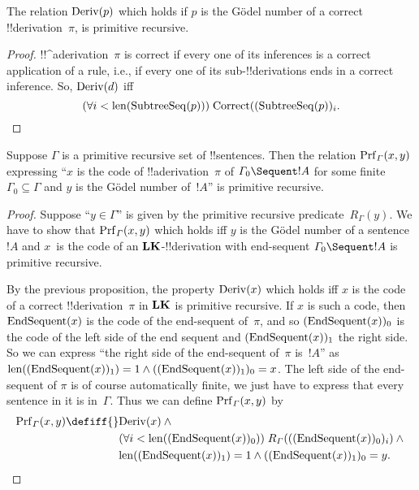 \documentclass[../../../include/open-logic-section]{subfiles}
\begin{document}
\begin{prop}
  The relation $\mathrm{Deriv}(p)$ which holds if $p$ is the G\"odel
  number of a correct !!{derivation}~$\pi$, is primitive recursive.
\end{prop}

\begin{proof}
  !!^a{derivation}~$\pi$ is correct if every one of its inferences
  is a correct application of a rule, i.e., if every one of its
  sub-!!{derivation}s ends in a correct inference. So, $\mathrm{Deriv}(d)$
  iff
  \[
  (\forall i<\mathrm{len}(\mathrm{SubtreeSeq}(p)))\; \mathrm{Correct}((\mathrm{SubtreeSeq}(p))_i.
  \]
\end{proof}


\begin{prop}
Suppose $\Gamma$ is a primitive recursive set of !!{sentence}s.  Then
the relation $\Prf[\Gamma](x, y)$ expressing ``$x$ is the code of
!!a{derivation}~$\pi$ of $\Gamma_0 \Sequent !A$ for some finite
$\Gamma_0 \subseteq \Gamma$ and $y$ is the G\"odel number of~$!A$'' is
primitive recursive.
\end{prop}

\begin{proof}
Suppose ``$y \in \Gamma$'' is given by the primitive recursive
predicate~$R_\Gamma(y)$.  We have to show that $\Prf[\Gamma](x, y)$
which holds iff $y$ is the G\"odel number of a sentence~$!A$ and
$x$~is the code of an $\Log{LK}$-!!{derivation} with end-sequent
$\Gamma_0 \Sequent !A$ is primitive recursive.

By the previous proposition, the property $\mathrm{Deriv}(x)$ which holds
iff $x$ is the code of a correct !!{derivation}~$\pi$ in $\Log{LK}$ is
primitive recursive.  If $x$ is such a code, then $\mathrm{EndSequent}(x)$
is the code of the end-sequent of~$\pi$, and so
$(\mathrm{EndSequent}(x))_0$ is the code of the left side of the end
sequent and $(\mathrm{EndSequent}(x))_1$ the right side.  So we can
express ``the right side of the end-sequent of~$\pi$ is~$!A$'' as
$\mathrm{len}((\mathrm{EndSequent}(x))_1) = 1 \land ((\mathrm{EndSequent}(x))_1)_0 =
x$.  The left side of the end-sequent of $\pi$ is of course
automatically finite, we just have to express that every sentence in
it is in~$\Gamma$.  Thus we can define $\Prf[\Gamma](x, y)$ by
\begin{align*}
\Prf[\Gamma](x, y) \defiff {}&
\fn{Deriv}(x) \land {} \\
& \bforall{i <
  \len{(\fn{EndSequent}(x))_0}}{R_\Gamma(((\fn{EndSequent}(x))_0)_i)} \land {}\\
& \len{(\fn{EndSequent}(x))_1} = 1 \land ((\fn{EndSequent}(x))_1)_0 = y.
\end{align*}
\end{proof}
\end{document}
